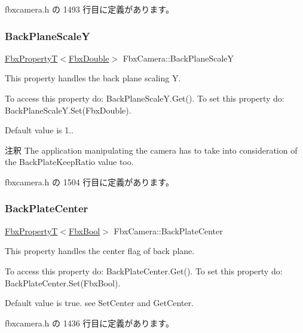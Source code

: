  fbxcamera.\+h の 1493 行目に定義があります。

\mbox{\label{class_fbx_camera_a24d51fab8fc1c619d813375b2aa88cfe}} 
\subsubsection{\texorpdfstring{Back\+Plane\+ScaleY}{BackPlaneScaleY}}
{\footnotesize\ttfamily \hyperlink{class_fbx_property_t}{Fbx\+PropertyT}$<$\hyperlink{fbxtypes_8h_a171e72a1c46fc15c1a6c9c31948c1c5b}{Fbx\+Double}$>$ Fbx\+Camera\+::\+Back\+Plane\+ScaleY}

This property handles the back plane scaling Y.

To access this property do\+: Back\+Plane\+Scale\+Y.\+Get(). To set this property do\+: Back\+Plane\+Scale\+Y.\+Set(\+Fbx\+Double).

Default value is 1.. \begin{DoxyRemark}{注釈}
The application manipulating the camera has to take into consideration of the Back\+Plate\+Keep\+Ratio value too. 
\end{DoxyRemark}


 fbxcamera.\+h の 1504 行目に定義があります。

\mbox{\label{class_fbx_camera_afc328eb5b70302973c991310d7ff9be3}} 
\subsubsection{\texorpdfstring{Back\+Plate\+Center}{BackPlateCenter}}
{\footnotesize\ttfamily \hyperlink{class_fbx_property_t}{Fbx\+PropertyT}$<$\hyperlink{fbxtypes_8h_a92e0562b2fe33e76a242f498b362262e}{Fbx\+Bool}$>$ Fbx\+Camera\+::\+Back\+Plate\+Center}

This property handles the center flag of back plane.

To access this property do\+: Back\+Plate\+Center.\+Get(). To set this property do\+: Back\+Plate\+Center.\+Set(\+Fbx\+Bool).

Default value is true. see Set\+Center and Get\+Center. 

 fbxcamera.\+h の 1436 行目に定義があります。

